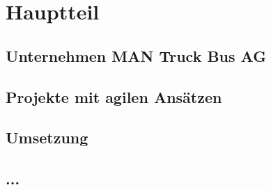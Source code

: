 
\chapter{Hauptteil}


\section{Unternehmen MAN Truck Bus AG}


\section{Projekte mit agilen Ansätzen}


\section{Umsetzung}


\section{ ...}